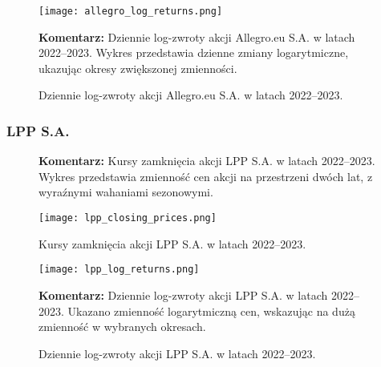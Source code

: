 \documentclass[12pt]{article}
\begin{document}
\vspace{0.5cm}

\begin{figure}[H]
    \centering
    \begin{minipage}[t]{0.45\textwidth}
        \centering
        \texttt{[image: allegro\_log\_returns.png]}
        \caption{Dziennie log-zwroty akcji Allegro.eu S.A. w latach 2022–2023.}
        \label{fig:allegro_log_returns}
    \end{minipage}%
    \hfill
    \begin{minipage}[t]{0.45\textwidth}
        \vspace{-5cm} 
        \justifying
        \textbf{Komentarz:} Dziennie log-zwroty akcji Allegro.eu S.A. w latach 2022–2023. 
        Wykres przedstawia dzienne zmiany logarytmiczne, ukazując okresy zwiększonej zmienności.
    \end{minipage}
\end{figure}

\vspace{1cm}

\subsubsection{LPP S.A.}

\begin{figure}[H]
    \centering
    \begin{minipage}[t]{0.45\textwidth}
        \vspace{-5cm}
        \justifying
        \textbf{Komentarz:} Kursy zamknięcia akcji LPP S.A. w latach 2022–2023. 
        Wykres przedstawia zmienność cen akcji na przestrzeni dwóch lat, z wyraźnymi wahaniami sezonowymi.
    \end{minipage}%
    \hfill
    \begin{minipage}[t]{0.45\textwidth}
        \centering
        \texttt{[image: lpp\_closing\_prices.png]}
        \caption{Kursy zamknięcia akcji LPP S.A. w latach 2022–2023.}
        \label{fig:lpp_closing_prices}
    \end{minipage}
\end{figure}

\vspace{0.5cm}

\begin{figure}[H]
    \centering
    \begin{minipage}[t]{0.45\textwidth}
        \centering
        \texttt{[image: lpp\_log\_returns.png]}
        \caption{Dziennie log-zwroty akcji LPP S.A. w latach 2022–2023.}
        \label{fig:lpp_log_returns}
    \end{minipage}%
    \hfill
    \begin{minipage}[t]{0.45\textwidth}
        \vspace{-5cm} 
        \justifying
        \textbf{Komentarz:} Dziennie log-zwroty akcji LPP S.A. w latach 2022–2023. 
        Ukazano zmienność logarytmiczną cen, wskazując na dużą zmienność w wybranych okresach.
    \end{minipage}
\end{figure}
\end{document}
